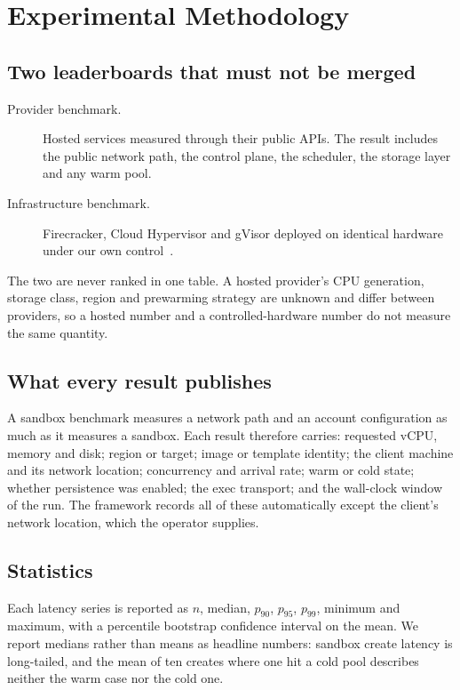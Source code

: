 \section{Experimental Methodology}
\label{sec:methodology}

\subsection{Two leaderboards that must not be merged}

\begin{description}
  \item[Provider benchmark.] Hosted services measured through their public
  APIs. The result includes the public network path, the control plane, the
  scheduler, the storage layer and any warm pool.
  \item[Infrastructure benchmark.] Firecracker, Cloud Hypervisor and gVisor
  deployed on identical hardware under our own
  control~\cite{firecracker2020,gvisor2019}.
\end{description}

The two are never ranked in one table. A hosted provider's CPU generation,
storage class, region and prewarming strategy are unknown and differ between
providers, so a hosted number and a controlled-hardware number do not measure
the same quantity.

\subsection{What every result publishes}

A sandbox benchmark measures a network path and an account configuration as
much as it measures a sandbox. Each result therefore carries: requested vCPU,
memory and disk; region or target; image or template identity; the client
machine and its network location; concurrency and arrival rate; warm or cold
state; whether persistence was enabled; the exec transport; and the wall-clock
window of the run. The framework records all of these automatically except the
client's network location, which the operator supplies.

\subsection{Statistics}

Each latency series is reported as $n$, median, $p_{90}$, $p_{95}$, $p_{99}$,
minimum and maximum, with a percentile bootstrap confidence interval on the
mean. We report medians rather than means as headline numbers: sandbox create
latency is long-tailed, and the mean of ten creates where one hit a cold pool
describes neither the warm case nor the cold one.


